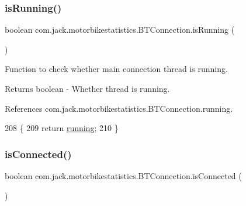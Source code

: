 \mbox{\label{classcom_1_1jack_1_1motorbikestatistics_1_1_b_t_connection_a17b07494b0e7cba2e550054d7b47e309}} 
\subsubsection{\texorpdfstring{is\+Running()}{isRunning()}}
{\footnotesize\ttfamily boolean com.\+jack.\+motorbikestatistics.\+B\+T\+Connection.\+is\+Running (\begin{DoxyParamCaption}{ }\end{DoxyParamCaption})\hspace{0.3cm}{\ttfamily [inline]}}



Function to check whether main connection thread is running. 

\begin{DoxyReturn}{Returns}
boolean -\/ Whether thread is running. 
\end{DoxyReturn}


References com.\+jack.\+motorbikestatistics.\+B\+T\+Connection.\+running.


\begin{DoxyCode}
208                                \{
209         \textcolor{keywordflow}{return} \hyperlink{classcom_1_1jack_1_1motorbikestatistics_1_1_b_t_connection_a6193b7b92b7f2905a3a43d63db40aba8}{running};
210     \}
\end{DoxyCode}
\mbox{\label{classcom_1_1jack_1_1motorbikestatistics_1_1_b_t_connection_a22f33e46d9f460d78865d4c63b645357}} 
\subsubsection{\texorpdfstring{is\+Connected()}{isConnected()}}
{\footnotesize\ttfamily boolean com.\+jack.\+motorbikestatistics.\+B\+T\+Connection.\+is\+Connected (\begin{DoxyParamCaption}{ }\end{DoxyParamCaption})\hspace{0.3cm}{\ttfamily [inline]}}



